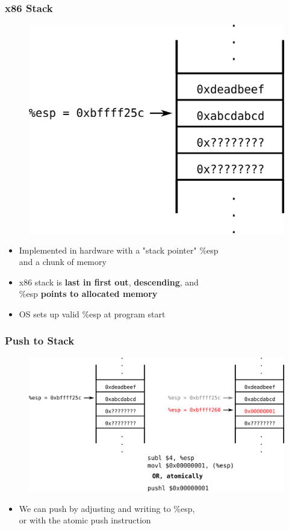 \documentclass[11pt,xcolor=dvipsnames]{beamer}
\begin{document}
\begin{frame}[fragile,t]
\frametitle{x86 Stack}
\begin{figure}
\centering
\includegraphics[height=0.4\paperheight]{figures/x86stack.png}
\end{figure}
\begin{itemize}
  \item Implemented in hardware with a "stack pointer" {\ttfamily \%esp} \\ and a chunk of memory
  \item x86 stack is {\bf last in first out}, {\bf descending}, and \\ {\ttfamily \%esp} {\bf points to allocated memory}
  \item OS sets up valid {\ttfamily \%esp} at program start
\end{itemize}
\end{frame}

\begin{frame}[fragile,t]
\frametitle{Push to Stack}
\begin{figure}
\centering
\includegraphics[height=0.6\paperheight]{figures/x86stackpush.png}
\end{figure}
\begin{itemize}
\item We can push by adjusting and writing to {\ttfamily \%esp}, \\ or with the atomic {\ttfamily push} instruction
\end{itemize}
\end{frame}
\end{document}
